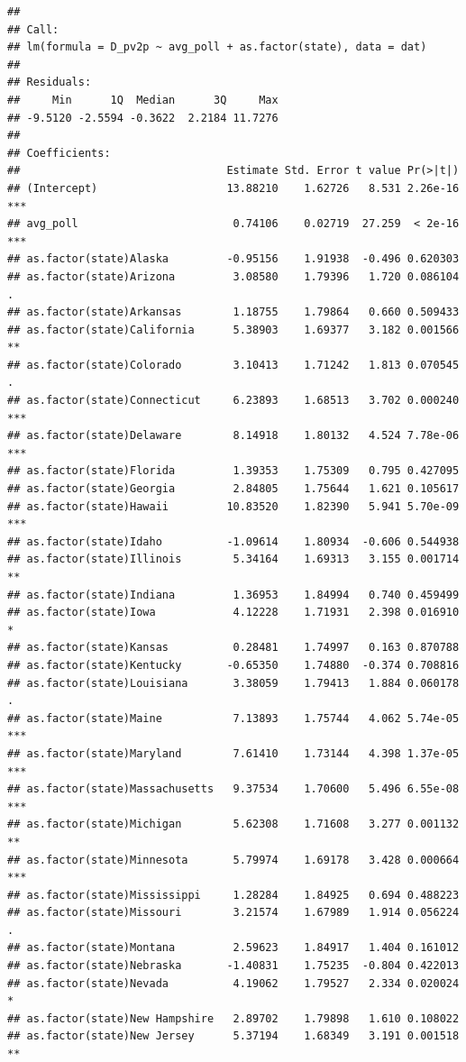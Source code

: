 \documentclass[
]{article}
\begin{document}
\begin{verbatim}
## 
## Call:
## lm(formula = D_pv2p ~ avg_poll + as.factor(state), data = dat)
## 
## Residuals:
##     Min      1Q  Median      3Q     Max 
## -9.5120 -2.5594 -0.3622  2.2184 11.7276 
## 
## Coefficients:
##                                Estimate Std. Error t value Pr(>|t|)    
## (Intercept)                    13.88210    1.62726   8.531 2.26e-16 ***
## avg_poll                        0.74106    0.02719  27.259  < 2e-16 ***
## as.factor(state)Alaska         -0.95156    1.91938  -0.496 0.620303    
## as.factor(state)Arizona         3.08580    1.79396   1.720 0.086104 .  
## as.factor(state)Arkansas        1.18755    1.79864   0.660 0.509433    
## as.factor(state)California      5.38903    1.69377   3.182 0.001566 ** 
## as.factor(state)Colorado        3.10413    1.71242   1.813 0.070545 .  
## as.factor(state)Connecticut     6.23893    1.68513   3.702 0.000240 ***
## as.factor(state)Delaware        8.14918    1.80132   4.524 7.78e-06 ***
## as.factor(state)Florida         1.39353    1.75309   0.795 0.427095    
## as.factor(state)Georgia         2.84805    1.75644   1.621 0.105617    
## as.factor(state)Hawaii         10.83520    1.82390   5.941 5.70e-09 ***
## as.factor(state)Idaho          -1.09614    1.80934  -0.606 0.544938    
## as.factor(state)Illinois        5.34164    1.69313   3.155 0.001714 ** 
## as.factor(state)Indiana         1.36953    1.84994   0.740 0.459499    
## as.factor(state)Iowa            4.12228    1.71931   2.398 0.016910 *  
## as.factor(state)Kansas          0.28481    1.74997   0.163 0.870788    
## as.factor(state)Kentucky       -0.65350    1.74880  -0.374 0.708816    
## as.factor(state)Louisiana       3.38059    1.79413   1.884 0.060178 .  
## as.factor(state)Maine           7.13893    1.75744   4.062 5.74e-05 ***
## as.factor(state)Maryland        7.61410    1.73144   4.398 1.37e-05 ***
## as.factor(state)Massachusetts   9.37534    1.70600   5.496 6.55e-08 ***
## as.factor(state)Michigan        5.62308    1.71608   3.277 0.001132 ** 
## as.factor(state)Minnesota       5.79974    1.69178   3.428 0.000664 ***
## as.factor(state)Mississippi     1.28284    1.84925   0.694 0.488223    
## as.factor(state)Missouri        3.21574    1.67989   1.914 0.056224 .  
## as.factor(state)Montana         2.59623    1.84917   1.404 0.161012    
## as.factor(state)Nebraska       -1.40831    1.75235  -0.804 0.422013    
## as.factor(state)Nevada          4.19062    1.79527   2.334 0.020024 *  
## as.factor(state)New Hampshire   2.89702    1.79898   1.610 0.108022    
## as.factor(state)New Jersey      5.37194    1.68349   3.191 0.001518 ** 

\end{verbatim}
\end{document}
